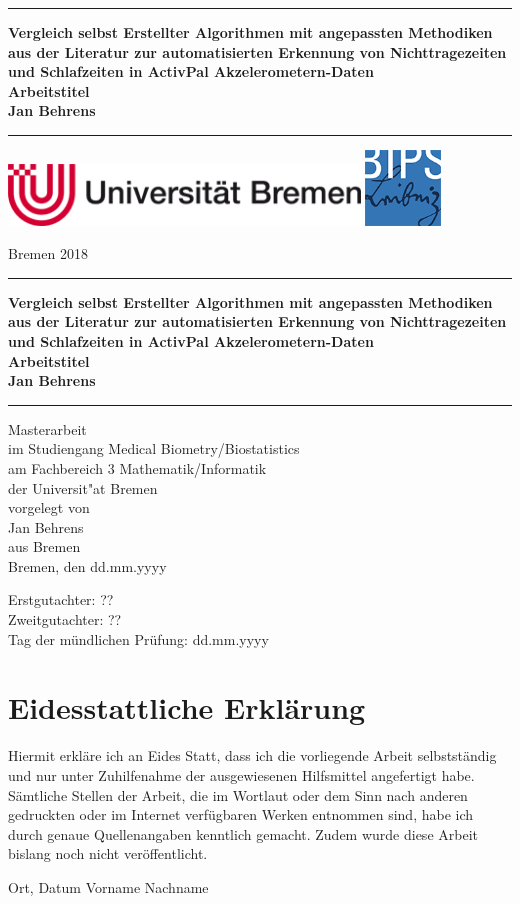 \documentclass[12pt]{book}
\newcommand{\LMUTitle}[9]{
  \thispagestyle{empty}
  \vspace*{\stretch{1}}
  {\parindent0cm
   \rule{\linewidth}{.7ex}}
  \begin{flushright}

    \vspace*{\stretch{1}}
    \sffamily\bfseries\Huge
    #1\\
    \vspace*{\stretch{1}}
    \sffamily\bfseries\large
    #2
    \vspace*{\stretch{1}}
  \end{flushright}
  \rule{\linewidth}{.7ex}
  \vspace*{\stretch{5}}
  \begin{center}
    \includegraphics[width=0.7\textwidth]{logo_ub.png}
    \qquad \quad
    \includegraphics[width=0.15\textwidth]{bips-logo.png}
  \end{center}
  \vspace*{\stretch{1}}
  \begin{center}\sffamily\LARGE{#5}\end{center}
  \newpage
  \thispagestyle{empty}

  \cleardoublepage
  \thispagestyle{empty}

  \vspace*{\stretch{1}}
  {\parindent0cm
  \rule{\linewidth}{.7ex}}
  \begin{flushright}
    \vspace*{\stretch{1}}
    \sffamily\bfseries\Huge
    #1\\
    \vspace*{\stretch{1}}
    \sffamily\bfseries\large
    #2
    \vspace*{\stretch{1}}
  \end{flushright}
  \rule{\linewidth}{.7ex}

  \vspace*{\stretch{3}}
  \begin{center}
    \Large Masterarbeit\\
    \Large im Studiengang Medical Biometry/Biostatistics \\
    \Large am #4\\
    \Large der Universit"at Bremen\\
    \vspace*{\stretch{1}}
    \Large vorgelegt von\\
    \Large #2\\
    \Large aus #3\\
    \vspace*{\stretch{2}}
    \Large Bremen, den #6
  \end{center}

  \newpage
  \thispagestyle{empty}

  \vspace*{\stretch{1}}

  \begin{flushleft}
    \large Erstgutachter:  #7 \\[1mm]
    \large Zweitgutachter: #8 \\[1mm]
    \large Tag der m\"undlichen Pr\"ufung: #9\\
  \end{flushleft}

  \cleardoublepage
}
\begin{document}
  \frontmatter


  \LMUTitle
      {Vergleich selbst Erstellter Algorithmen mit angepassten Methodiken aus der Literatur zur automatisierten Erkennung von Nichttragezeiten und Schlafzeiten in ActivPal Akzelerometern-Daten \\
       Arbeitstitel}               %
      {Jan Behrens}                       %
      {Bremen}                             %
      {Fachbereich 3 Mathematik/Informatik}     %
      {Bremen 2018}                          %
      {dd.mm.yyyy}                            %
      {??}                          %
      {??}                         %
      {dd.mm.yyyy}                         %

 \chapter*{Eidesstattliche Erklärung}
    Hiermit erkläre ich an Eides Statt, dass ich die vorliegende Arbeit selbstständig und nur unter Zuhilfenahme der ausgewiesenen Hilfsmittel angefertigt habe. Sämtliche Stellen der Arbeit, die im Wortlaut oder dem Sinn nach anderen gedruckten oder im Internet verfügbaren Werken entnommen sind, habe ich durch genaue Quellenangaben kenntlich gemacht. Zudem wurde diese Arbeit bislang noch nicht veröffentlicht.
    
    \vspace{30mm} 
    
    Ort, Datum  \hspace{60mm} Vorname Nachname
    
  \tableofcontents

  

  \listoffigures

  \listoftables
  \cleardoublepage


  


  \mainmatter\setcounter{page}{1}
  
  
  
  
  
  


  
  
  \markboth{}{}


  
  \backmatter
\end{document}
